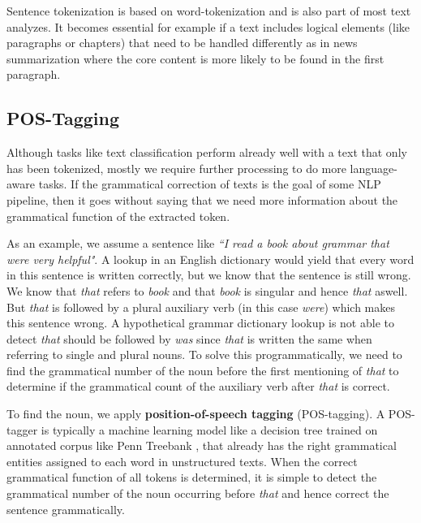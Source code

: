   Sentence tokenization is based on word-tokenization and is also part of most text analyzes.
  It becomes essential for example if a text includes logical elements (like paragraphs or chapters) that need to be handled differently as in news summarization where the core content is more likely to be found in the first paragraph.


\subsection{POS-Tagging}
  Although tasks like text classification perform already well with a text that only has been tokenized, mostly we require further processing to do more language-aware tasks.
  If the grammatical correction of texts is the goal of some NLP pipeline, then it goes without saying that we need more information about the grammatical function of the extracted token.

  As an example, we assume a sentence like \textit{``I read a book about grammar that were very helpful"}.
  A lookup in an English dictionary would yield that every word in this sentence is written correctly, but we know that the sentence is still wrong.
  We know that \textit{that} refers to \textit{book} and that \textit{book} is singular and hence \textit{that} aswell.
  But \textit{that} is followed by a plural auxiliary verb (in this case \textit{were}) which makes this sentence wrong.
  A hypothetical grammar dictionary lookup is not able to detect \textit{that} should be followed by \textit{was} since \textit{that} is written the same when referring to single and plural nouns.
  To solve this programmatically, we need to find the grammatical number of the noun before the first mentioning of \textit{that} to determine if the grammatical count of the auxiliary verb after \textit{that} is correct.

  To find the noun, we apply \textbf{position-of-speech tagging} (\gls{POS-tagging}).
  A POS-tagger is typically a machine learning model like a decision tree \citep{Marquez98} trained on annotated corpus like Penn Treebank \citep{PennTreebank}, that already has the right grammatical entities assigned to each word in unstructured texts.
  When the correct grammatical function of all tokens is determined, it is simple to detect the grammatical number of the noun occurring before \textit{that} and hence correct the sentence grammatically.

